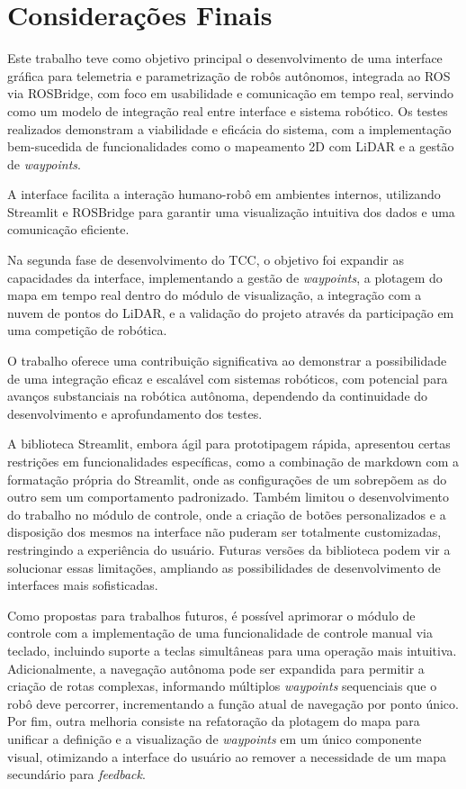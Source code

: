 \section{Considerações Finais}

Este trabalho teve como objetivo principal o desenvolvimento de uma interface gráfica para telemetria e parametrização de robôs autônomos, integrada ao ROS via ROSBridge, com foco em usabilidade e comunicação em tempo real, servindo como um modelo de integração real entre interface e sistema robótico. Os testes realizados demonstram a viabilidade e eficácia do sistema, com a implementação bem-sucedida de funcionalidades como o mapeamento 2D com LiDAR e a gestão de \textit{waypoints}.

A interface facilita a interação humano-robô em ambientes internos, utilizando Streamlit e ROSBridge para garantir uma visualização intuitiva dos dados e uma comunicação eficiente.

Na segunda fase de desenvolvimento do TCC, o objetivo foi expandir as capacidades da interface, implementando a gestão de \textit{waypoints}, a plotagem do mapa em tempo real dentro do módulo de visualização, a integração com a nuvem de pontos do LiDAR, e a validação do projeto através da participação em uma competição de robótica.

O trabalho oferece uma contribuição significativa ao demonstrar a possibilidade de uma integração eficaz e escalável com sistemas robóticos, com potencial para avanços substanciais na robótica autônoma, dependendo da continuidade do desenvolvimento e aprofundamento dos testes.

A biblioteca Streamlit, embora ágil para prototipagem rápida, apresentou certas restrições em funcionalidades específicas, como a combinação de markdown com a formatação própria do Streamlit, onde as configurações de um sobrepõem as do outro sem um comportamento padronizado. Também limitou o desenvolvimento do trabalho no módulo de controle, onde a criação de botões personalizados e a disposição dos mesmos na interface não puderam ser totalmente customizadas, restringindo a experiência do usuário. Futuras versões da biblioteca podem vir a solucionar essas limitações, ampliando as possibilidades de desenvolvimento de interfaces mais sofisticadas.

Como propostas para trabalhos futuros, é possível aprimorar o módulo de controle com a implementação de uma funcionalidade de controle manual via teclado, incluindo suporte a teclas simultâneas para uma operação mais intuitiva. Adicionalmente, a navegação autônoma pode ser expandida para permitir a criação de rotas complexas, informando múltiplos \textit{waypoints} sequenciais que o robô deve percorrer, incrementando a função atual de navegação por ponto único. Por fim, outra melhoria consiste na refatoração da plotagem do mapa para unificar a definição e a visualização de \textit{waypoints} em um único componente visual, otimizando a interface do usuário ao remover a necessidade de um mapa secundário para \textit{feedback}.

    
